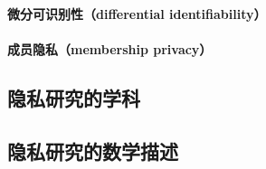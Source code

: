 \documentclass[12pt,a4paper]{article}
\begin{document}
\paragraph{微分可识别性（differential identifiability）}
\paragraph{成员隐私（membership privacy）} 

\subsection{隐私研究的学科}

\subsection{隐私研究的数学描述}





\end{document}
